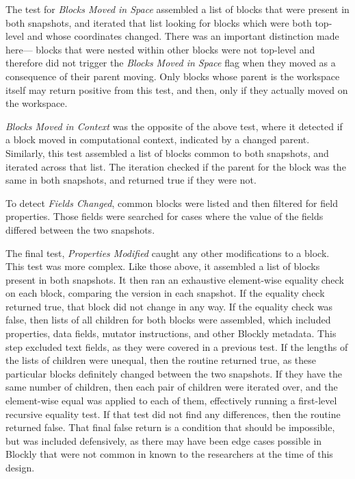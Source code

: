 The test for \emph{Blocks Moved in Space} assembled a list of blocks that were present in both snapshots, and iterated that list looking for blocks which were both top-level and whose coordinates changed. There was an important distinction made here--- blocks that were nested within other blocks were not top-level and therefore did not trigger the \emph{Blocks Moved in Space} flag when they moved as a consequence of their parent moving. Only blocks whose parent is the workspace itself may return positive from this test, and then, only if they actually moved on the workspace.

\emph{Blocks Moved in Context} was the opposite of the above test, where it detected if a block moved in computational context, indicated by a changed parent. Similarly, this test assembled a list of blocks common to both snapshots, and iterated across that list. The iteration checked if the parent for the block was the same in both snapshots, and returned true if they were not. 

To detect \emph{Fields Changed}, common blocks were listed and then filtered for field properties. Those fields were searched for cases where the value of the fields differed between the two snapshots.

The final test, \emph{Properties Modified} caught any other modifications to a block. This test was more complex. Like those above, it assembled a list of blocks present in both snapshots. It then ran an exhaustive element-wise equality check on each block, comparing the version in each snapshot. If the equality check returned true, that block did not change in any way. If the equality check was false, then lists of all children for both blocks were assembled, which included properties, data fields, mutator instructions, and other Blockly metadata. This step excluded text fields, as they were covered in a previous test. If the lengths of the lists of children were unequal, then the routine returned true, as these particular blocks definitely changed between the two snapshots. If they have the same number of children, then each pair of children were iterated over, and the element-wise equal was applied to each of them, effectively running a first-level recursive equality test. If that test did not find any differences, then the routine returned false. That final false return is a condition that should be impossible, but was included defensively, as there may have been edge cases possible in Blockly that were not common in known to the researchers at the time of this design.


